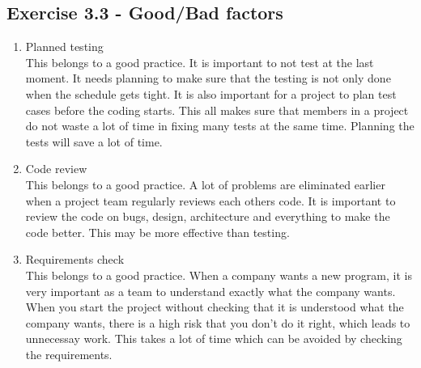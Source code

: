 \documentclass[10pt]{article}
\begin{document}
\subsection{Exercise 3.3 - Good/Bad factors}
\begin{enumerate}
\item Planned testing \hfill \\
This belongs to a good practice. It is important to not test at the last moment. It needs planning to make sure that the testing is not only done when the schedule gets tight. It is also important for a project to plan test cases before the coding starts. This all makes sure that members in a project do not waste a lot of time in fixing many tests at the same time. Planning the tests will save a lot of time.
\item Code review \hfill \\
This belongs to a good practice. A lot of problems are eliminated earlier when a project team regularly reviews each others code. It is important to review the code on bugs, design, architecture and everything to make the code better. This may be more effective than testing.
\item Requirements check \hfill \\
This belongs to a good practice. When a company wants a new program, it is very important as a team to understand exactly what the company wants. When you start the project without checking that it is understood what the company wants, there is a high risk that you don't do it right, which leads to unnecessay work. This takes a lot of time which can be avoided by checking the requirements.
\end{enumerate}
\end{document}
